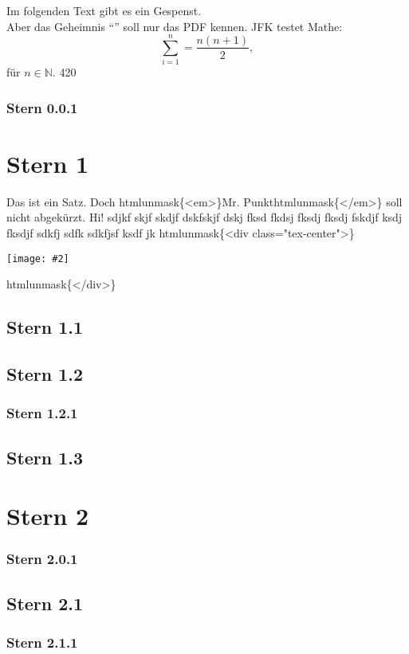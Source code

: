 \documentclass{article}
\title{\mytitle}
\newcommand{\mytitle}{How To Zotero: Gardner/Springfeld-CSL}
\newif\ifhtml
\newcommand{\htmlonly}[1]{\ifhtml#1\else\fi}
\newif\ifpdf
\newcommand{\pdfonly}[1]{\ifpdf#1\else\fi}
\newcommand{\htmltagunique}[1]{htmlunmask\{#1\}}
\newcommand{\htmltag}[3]{\htmltagunique{#1}#2\htmltagunique{#3}}
\newcommand{\htmltagunique}[1]{}
\newcommand{\htmltag}[3]{#2}
\newcommand{\incl}[2]{\begin{center}\texttt{[image: \#2]}\end{center}}
\newcommand{\inclc}[2]{\htmltag{<div class="tex-center">}{\incl{#1}{#2}}{</div>}}
\newcommand{\inclc}[2]{\begin{center}\incl{#1}{#2}\end{center}}
\begin{document}
\pdfonly{
\begin{center}
{\LARGE\textbf\mytitle}
\end{center}
}
Im folgenden Text gibt es ein \htmlonly{verstecktes} Gespenst.
\\
Aber das Geheimnis ``\pdfonly{hihihi}'' soll nur das PDF kennen. JFK testet Mathe:
\[
	\sum_{i=1}^n=\frac{n(n+1)}{2},
\]
f\"ur \(n\in\mathbb{N}\).
420\htmlonly{69}
\pdfonly{pdfonly}
\pagestyle{fancy}
\subsubsection{Stern 0.0.1}
\section{Stern 1}
Das ist ein Satz. Doch \htmltag{<em>}{Mr. Punkt}{</em>} soll nicht abgek\"urzt. Hi! sdjkf skjf skdjf dskfskjf dskj fksd fkdsj fksdj fksdj fskdjf ksdj fksdjf sdkfj sdfk sdkfjsf ksdf jk
\inclc{0.5}{res/smile.png}
\subsection{Stern 1.1}
\subsection{Stern 1.2}
\subsubsection{Stern 1.2.1}
\subsection{Stern 1.3}
\section{Stern 2}
\subsubsection{Stern 2.0.1}
\subsection{Stern 2.1}
\subsubsection{Stern 2.1.1}
\end{document}
